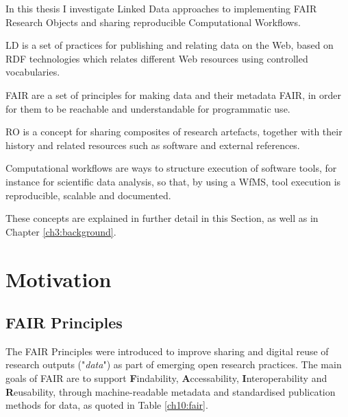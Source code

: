 
In this thesis I investigate Linked Data approaches to implementing FAIR Research Objects and sharing reproducible Computational Workflows.

\acrlong{LD} is a set of practices for publishing and relating data on the Web, based on \acrshort{RDF} technologies which relates different Web resources using controlled vocabularies. 

\acrshort{FAIR} are a set of principles for making data and their metadata \acrlong{FAIR}, in order for them to be reachable and understandable for programmatic use.

\acrfull{RO} is a concept for sharing composites of research artefacts, together with their history and related resources such as software and external references.
 
Computational \Glspl{workflow} are ways to structure execution of software tools, for instance for scientific data analysis, so that, by using a \gls{WfMS}, tool execution is reproducible, scalable and documented.

These concepts are explained in further detail in this Section, as well as in Chapter \vref{ch3:background}.


\section{Motivation}

\subsection{FAIR Principles}
\label{ch10:fair-principles}

The \acrshort{FAIR} Principles \cite{Wilkinson 2016} were introduced to improve sharing and digital reuse of research outputs ("\emph{data}") as part of emerging open research practices. The main goals of FAIR are to support \textbf{F}indability, \textbf{A}ccessability, \textbf{I}nteroperability and \textbf{R}eusability, through machine-readable metadata and standardised publication methods for data, as quoted in Table \vref{ch10:fair}.

